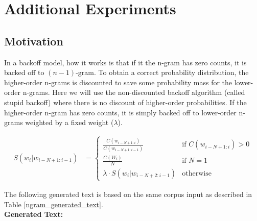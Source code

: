 \section{Additional Experiments}\label{sec:backoff}

\subsection{Motivation \cite{n-gram:ch3}}
In a backoff model, how it works is that if it the n-gram has zero counts, it is backed off to $(n-1)$-gram.
To obtain a correct probability distribution, the higher-order n-grams is discounted to save some probability mass for the lower-order n-grams. 
Here we will use the non-discounted backoff algorithm (called stupid backoff) where there is no discount of higher-order probabilities.
If the higher-order n-gram has zero counts, it is simply backed off to lower-order n-grams weighted by a fixed weight ($\lambda$).

\begin{align}
    S(w_i | w_{i-N+1:i-1}) &= \begin{cases}
        \frac{C(w_{i-N+1:i})}{C(w_{i-N+1:i-1})} & \text{if } C(w_{i-N+1:i}) > 0\\
        \frac{C(W_i)}{N} & \text{if } N = 1\\
        \lambda \cdot S(w_i | w_{i-N+2:i-1}) & \text{otherwise}
    \end{cases}
\end{align}

The following generated text is based on the same corpus input as described in Table \ref{ngram_generated_text}.\\
\textbf{Generated Text:} 
\texttt{}